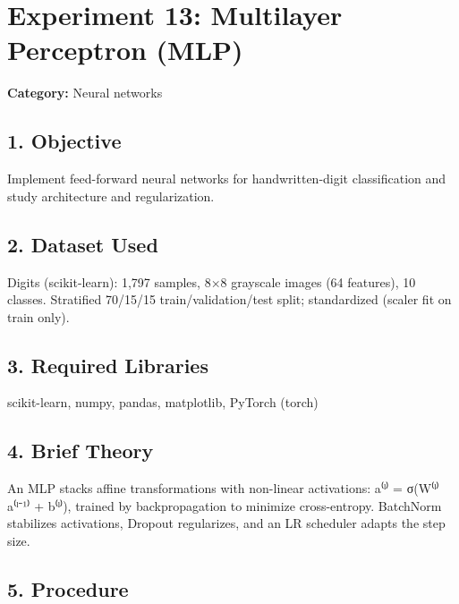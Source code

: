 
\chapter{Experiment 13: Multilayer Perceptron
(MLP)}\label{experiment-13-multilayer-perceptron-mlp}

\textbf{Category:} Neural networks

\section{1. Objective}\label{objective}

Implement feed-forward neural networks for handwritten-digit
classification and study architecture and regularization.

\section{2. Dataset Used}\label{dataset-used}

Digits (scikit-learn): 1,797 samples, 8×8 grayscale images (64
features), 10 classes. Stratified 70/15/15 train/validation/test split;
standardized (scaler fit on train only).

\section{3. Required Libraries}\label{required-libraries}

scikit-learn, numpy, pandas, matplotlib, PyTorch (torch)

\section{4. Brief Theory}\label{brief-theory}

An MLP stacks affine transformations with non-linear activations: a⁽ˡ⁾ =
σ(W⁽ˡ⁾a⁽ˡ⁻¹⁾ + b⁽ˡ⁾), trained by backpropagation to minimize
cross-entropy. BatchNorm stabilizes activations, Dropout regularizes,
and an LR scheduler adapts the step size.

\section{5. Procedure}\label{procedure}

